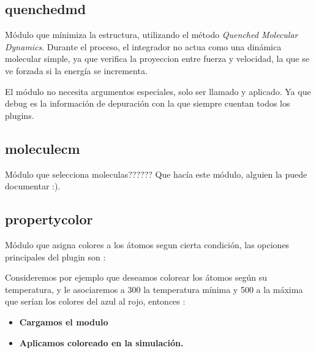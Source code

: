 \subsection{quenchedmd}
M\'odulo que m\'inimiza la estructura, utilizando el m\'etodo \textit{Quenched Molecular Dynamics}. Durante el proceso, el integrador no actua como una din\'amica molecular simple, ya que verifica la proyeccion entre fuerza y velocidad, la que se ve forzada si la energ\'ia se incrementa.


El m\'odulo no necesita argumentos especiales, solo ser llamado y aplicado. Ya que debug es la informaci\'on de depuraci\'on con la que siempre cuentan todos los plugins.

\subsection{moleculecm}
M\'odulo que selecciona moleculas?????? Que hacía este módulo, alguien la puede documentar :).



\subsection{propertycolor}
M\'odulo que asigna colores a los \'atomos segun cierta condici\'on, las opciones principales del plugin son :


Consideremos por ejemplo que deseamos colorear los \'atomos seg\'un su temperatura, y le asociaremos a 300 la temperatura m\'inima y 500 a la m\'axima que ser\'ian los colores del azul al rojo, entonces :

\begin{itemize}
 \item \textbf{Cargamos el modulo}
 \item \textbf{Aplicamos coloreado en la simulaci\'on.}
\end{itemize}

